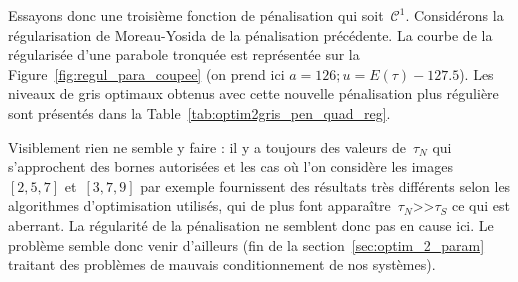 \documentclass[main.tex]{subfiles}
\begin{document}

Essayons donc une troisième fonction de pénalisation qui soit~$\mathcal{C}^1$. Considérons la régularisation de Moreau-Yosida de la pénalisation précédente. La courbe de la régularisée d'une parabole tronquée est représentée sur la Figure~\ref{fig:regul_para_coupee} (on prend ici $a=126; u=E(\tau)-127.5$). Les niveaux de gris optimaux obtenus avec cette nouvelle pénalisation plus régulière sont présentés dans la Table~\ref{tab:optim2gris_pen_quad_reg}.


Visiblement rien ne semble y faire : il y a toujours des valeurs de~$\tau_N$ qui s'approchent des bornes autorisées et les cas où l'on considère les images~$[2,5,7]$ et~$[3,7,9]$ par exemple  fournissent des résultats très différents selon les algorithmes d'optimisation utilisés, qui de plus font apparaître~$\tau_N$>>$\tau_S$ ce qui est aberrant.
La régularité de la pénalisation ne semblent donc pas en cause ici. Le problème semble donc venir d'ailleurs (\cf fin de la section~\ref{sec:optim_2_param} traitant des problèmes de mauvais  conditionnement de nos systèmes).

\end{document}
